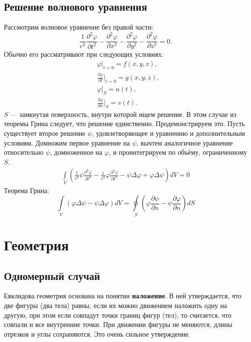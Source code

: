 \documentclass[a4paper,14pt]{extreport} %
\newcommand{\dff}[2]{\frac{\partial #1}{\partial #2}}
\newcommand{\dfs}[2]{\frac{\partial^2 #1}{\partial #2^2}}
\begin{document}
	\section{Решение волнового уравнения}
	
	Рассмотрим волновое уравнение без правой части:
	\begin{equation*}
		\frac{1}{c^2}\dfs{\varphi}{t} - \dfs{\varphi}{x} - \dfs{\varphi}{y} - \dfs{\varphi}{z} = 0.
	\end{equation*}
	Обычно его рассматривают при следующих условиях:
	\begin{align*}
		&\varphi\Big|_{t = 0} = f(x, y, z),\\
		&\dff{\varphi}{t} \Big|_{t = 0} = g(x, y, z),\\
		&\varphi \Big|_S = u(t), \\
		&\dff{\varphi}{n} \Big|_S = v(t).
	\end{align*}
	$S$ --- замкнутая поверхность, внутри которой ищем решение. В этом случае из теоремы Грина следует, что решение единственно. Продемонстрируем это. Пусть существует второе решение $\psi$, удовлетворяющее и уравнению и дополнительным условиям. Домножим первое уравнение на $\psi$, вычтем аналогичное уравнение относительно $\psi$, домноженное на $\varphi$, и проинтегрируем по объёму, ограниченному $S$.
	\begin{equation*}
		\begin{gathered}
			\int\limits_{V} \left(\frac{1}{c^2} \psi \dfs{\varphi}{t} - \frac{1}{c^2}\varphi \dfs{\psi}{t} - \psi \Delta \varphi + \varphi \Delta \psi \right) dV = 0
		\end{gathered}
	\end{equation*}
	Теорема Грина:
	\begin{equation*}
		\int\limits_V (\varphi \Delta \psi - \psi \Delta \varphi) dV = \oint\limits_S \left(\varphi \dff{\psi}{n} - \psi \dff{\varphi}{n} \right) dS
	\end{equation*}
	
	\chapter{Геометрия}
	
	\section{Одномерный случай}
	
	Евклидова геометрия основана на понятии \textbf{наложение}. В ней утверждается, что две фигуры (два тела) равны, если их можно движением наложить одну на другую, при этом если совпадут точки границ фигур (тел), то считается, что совпали и все внутренние точки. При движении фигуры не меняются, длины отрезков и углы сохраняются. Это очень сильное утверждение. 
	
\end{document}
